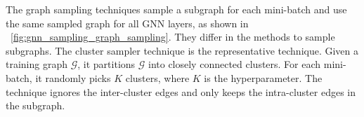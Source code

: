 The graph sampling techniques \cite{zeng2018_aesg, chiang2019_cluster_gcn, zeng2020_graphsaint} sample a subgraph for each mini-batch and use the same sampled graph for all GNN layers, as shown in \figurename~\ref{fig:gnn_sampling_graph_sampling}.
They differ in the methods to sample subgraphs.
The cluster sampler technique \cite{chiang2019_cluster_gcn} is the representative technique.
Given a training graph $\mathcal{G}$, it partitions $\mathcal{G}$ into closely connected clusters.
For each mini-batch, it randomly picks $K$ clusters, where $K$ is the hyperparameter.
The technique ignores the inter-cluster edges and only keeps the intra-cluster edges in the subgraph.


